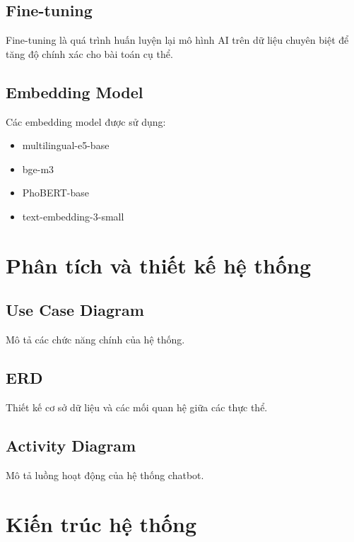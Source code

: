 \documentclass[12pt,a4paper]{report}
\begin{document}
	\section{Fine-tuning}
	
	Fine-tuning là quá trình huấn luyện lại mô hình AI trên dữ liệu chuyên biệt để tăng độ chính xác cho bài toán cụ thể.
	
	\section{Embedding Model}
	
	Các embedding model được sử dụng:
	\begin{itemize}
		\item multilingual-e5-base
		\item bge-m3
		\item PhoBERT-base
		\item text-embedding-3-small
	\end{itemize}
	
	\chapter{Phân tích và thiết kế hệ thống}
	
	\section{Use Case Diagram}
	
	Mô tả các chức năng chính của hệ thống.
	
	\section{ERD}
	
	Thiết kế cơ sở dữ liệu và các mối quan hệ giữa các thực thể.
	
	\section{Activity Diagram}
	
	Mô tả luồng hoạt động của hệ thống chatbot.
	
	\chapter{Kiến trúc hệ thống}
	
\end{document}
